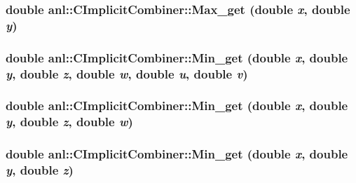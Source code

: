 \label{classanl_1_1CImplicitCombiner_a8ca2a27551a58f35e6acde35904c4958}
\hypertarget{classanl_1_1CImplicitCombiner_a69c8e91aab65ea2354d303a0220c578b}{
\subsubsection[{Max\_\-get}]{\setlength{\rightskip}{0pt plus 5cm}double anl::CImplicitCombiner::Max\_\-get (double {\em x}, \/  double {\em y})}}
\label{classanl_1_1CImplicitCombiner_a69c8e91aab65ea2354d303a0220c578b}
\hypertarget{classanl_1_1CImplicitCombiner_ab0b63b368fb0a49efcd2fd82d511027c}{
\subsubsection[{Min\_\-get}]{\setlength{\rightskip}{0pt plus 5cm}double anl::CImplicitCombiner::Min\_\-get (double {\em x}, \/  double {\em y}, \/  double {\em z}, \/  double {\em w}, \/  double {\em u}, \/  double {\em v})}}
\label{classanl_1_1CImplicitCombiner_ab0b63b368fb0a49efcd2fd82d511027c}
\hypertarget{classanl_1_1CImplicitCombiner_a4796d3cf8aab8f5f971f28cb6be04dd5}{
\subsubsection[{Min\_\-get}]{\setlength{\rightskip}{0pt plus 5cm}double anl::CImplicitCombiner::Min\_\-get (double {\em x}, \/  double {\em y}, \/  double {\em z}, \/  double {\em w})}}
\label{classanl_1_1CImplicitCombiner_a4796d3cf8aab8f5f971f28cb6be04dd5}
\hypertarget{classanl_1_1CImplicitCombiner_a59600499e680365658c78057ddc9be8a}{
\subsubsection[{Min\_\-get}]{\setlength{\rightskip}{0pt plus 5cm}double anl::CImplicitCombiner::Min\_\-get (double {\em x}, \/  double {\em y}, \/  double {\em z})}}
